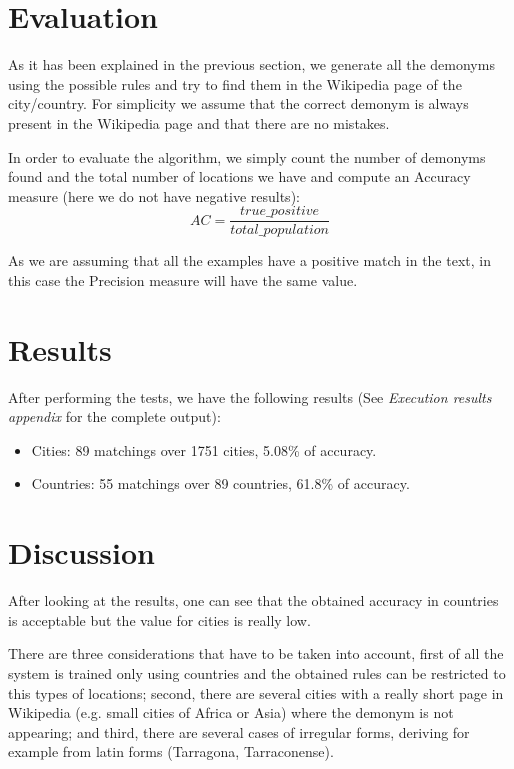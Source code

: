 \documentclass[]{report}
\begin{document}

\section{Evaluation}

As it has been explained in the previous section, we generate all the demonyms using the possible rules and try to find them in the Wikipedia page of the city/country. For simplicity we assume that the correct demonym is always present in the Wikipedia page and that there are no mistakes.

In order to evaluate the algorithm, we simply count the number of demonyms found and the total number of locations we have and compute an Accuracy measure (here we do not have negative results):
$$
AC = \frac{true\_positive}{total\_population}
$$

As we are assuming that all the examples have a positive match in the text, in this case the Precision measure will have the same value.

\section{Results}

After performing the tests, we have the following results (See \textit{Execution results appendix} for the complete output):
\begin{itemize}
\item Cities: 89 matchings over 1751 cities, 5.08\% of accuracy.
\item Countries: 55 matchings over 89 countries, 61.8\% of accuracy.
\end{itemize}



\section{Discussion}

After looking at the results, one can see that the obtained accuracy in countries is acceptable but the value for cities is really low.

There are three considerations that have to be taken into account, first of all the system is trained only using countries and the obtained rules can be restricted to this types of locations; second, there are several cities with a really short page in Wikipedia (e.g. small cities of Africa or Asia) where the demonym is not appearing; and third, there are several cases of irregular forms, deriving for example from latin forms (Tarragona, Tarraconense).
\end{document}
